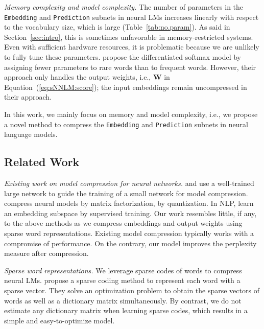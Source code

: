 \documentclass[11pt]{article}
\renewcommand{\vector}[1]{\bm{#1}}
\def\Embedding{\texttt{Embedding}}
\def\Prediction{\texttt{Prediction}}
\begin{document}
\textit{Memory complexity and model complexity.} The number of parameters in the \Embedding{} and \Prediction{} subnets in neural LMs increases linearly with respect to the vocabulary size, which is large (Table~\ref{tab:no.param}).
As said in Section~\ref{sec:intro}, this is sometimes unfavorable in memory-restricted systems.
Even with sufficient hardware resources, it is problematic because we are unlikely to fully tune these parameters.
 propose the differentiated softmax model by assigning fewer parameters to rare words than to frequent words.
However, their approach only handles the output weights, i.e., $\vector{W}$ in Equation~(\ref{eq:sNNLM:score}); the input embeddings remain uncompressed in their approach.

In this work, we mainly focus on memory and model complexity, i.e.,
we propose a novel method to compress the \Embedding{} and \Prediction{} subnets in neural language models.

\subsection{Related Work}
\textit{Existing work on model compression for neural networks.}  and  use a well-trained large network to guide the training of a small network for model compression.  compress neural models by matrix factorization,   by quantization. In NLP,  learn an embedding subspace by supervised training. Our work resembles little, if any, to the above methods as we compress embeddings and output weights using sparse word representations. Existing model compression typically works with a compromise of performance. On the contrary, our model improves the perplexity measure after compression.

\textit{Sparse word representations. }
We leverage sparse codes of words to compress neural LMs.
 propose a sparse coding method to represent each
word with a sparse vector. They solve an optimization problem to obtain the
sparse vectors of words as well as a dictionary matrix simultaneously.
By contrast, we do not estimate any dictionary matrix
when learning sparse codes,
which results in a simple and easy-to-optimize model.
\end{document}
